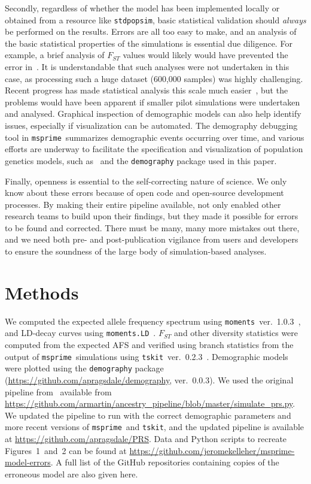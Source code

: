 \documentclass{article}
\newcommand{\msprime}[0]{\texttt{msprime}}
\newcommand{\stdpopsim}[0]{\texttt{stdpopsim}}
\newcommand{\tskit}[0]{\texttt{tskit}}
\begin{document}
Secondly, regardless of whether the model has been implemented
locally or obtained from a resource like \stdpopsim,
basic statistical validation should \emph{always} be performed on the
results. Errors are all too easy to make, and an analysis of the
basic statistical properties of the simulations is essential
due diligence. For example, a brief analysis of $F_{ST}$ values
would likely would have prevented the error in~\citet{martin2017human}.
It is understandable that such analyses were not undertaken in this
case, as processing such a huge dataset (600,000 samples) was
highly challenging. Recent progress has made statistical analysis this scale much
easier~\citep{ralph2020efficiently}, but the problems would have been
apparent if smaller pilot simulations were undertaken and analysed.
Graphical inspection of demographic models can also help identify issues, especially if
visualization can be automated. The demography debugging tool in \msprime\
summarizes demographic events occurring over time, and various efforts are underway to facilitate
the specification and visualization of population genetics models, such as~\citet{zhou2018popdemog}
and the \texttt{demography} package used in this paper.

Finally, openness is essential to the self-correcting nature of science.
We only know about these errors because of open code and
open-source development processes. By making their entire pipeline available,
\citet{martin2017human} not only enabled other research teams to build upon their findings,
but they made it possible for errors to be found and corrected.
There must be many, many more mistakes out there, and we need both
pre- and post-publication vigilance from users and developers to ensure the
soundness of the large body of simulation-based analyses.

\section*{Methods}

We computed the expected allele frequency spectrum using
\texttt{moments}~ver.~1.0.3~\citep{jouganous2017inferring}, and LD-decay curves using
\texttt{moments.LD}~\citep{ragsdale2019models}. $F_{ST}$ and other diversity statistics
were computed from the expected AFS and verified using branch statistics from
the output of \msprime\ simulations using \tskit~ver.~0.2.3~\citep{ralph2020efficiently}.
Demographic models were plotted using the \texttt{demography} package
(\url{https://github.com/apragsdale/demography}, ver.~0.0.3).
We used the original pipeline from~\citet{martin2017human} available from
\url{https://github.com/armartin/ancestry_pipeline/blob/master/simulate_prs.py}.
We updated the pipeline to run with the correct demographic parameters and more
recent versions of \msprime\ and \tskit, and the updated pipeline is
available at \url{https://github.com/apragsdale/PRS}.
Data and Python scripts to recreate Figures~1~and~2 can be found at
\url{https://github.com/jeromekelleher/msprime-model-errors}.
A full list of the GitHub repositories containing copies of the erroneous
model are also given here.
\end{document}
